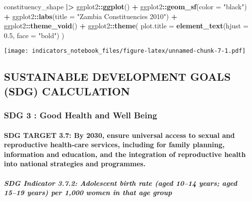 \documentclass[
]{article}
\newenvironment{Shaded}{\begin{snugshade}}{\end{snugshade}}
\newcommand{\AttributeTok}[1]{\textcolor[rgb]{0.13,0.29,0.53}{#1}}
\newcommand{\FloatTok}[1]{\textcolor[rgb]{0.00,0.00,0.81}{#1}}
\newcommand{\FunctionTok}[1]{\textcolor[rgb]{0.13,0.29,0.53}{\textbf{#1}}}
\newcommand{\NormalTok}[1]{#1}
\newcommand{\SpecialCharTok}[1]{\textcolor[rgb]{0.81,0.36,0.00}{\textbf{#1}}}
\newcommand{\StringTok}[1]{\textcolor[rgb]{0.31,0.60,0.02}{#1}}
\begin{document}
\begin{Shaded}
\begin{Highlighting}[]
\NormalTok{constituency\_shape }\SpecialCharTok{|\textgreater{}}
\NormalTok{  ggplot2}\SpecialCharTok{::}\FunctionTok{ggplot}\NormalTok{() }\SpecialCharTok{+}
\NormalTok{  ggplot2}\SpecialCharTok{::}\FunctionTok{geom\_sf}\NormalTok{(}\AttributeTok{color =} \StringTok{"black"}\NormalTok{) }\SpecialCharTok{+}
\NormalTok{  ggplot2}\SpecialCharTok{::}\FunctionTok{labs}\NormalTok{(}\AttributeTok{title =} \StringTok{"Zambia Constituencies 2010"}\NormalTok{) }\SpecialCharTok{+}
\NormalTok{  ggplot2}\SpecialCharTok{::}\FunctionTok{theme\_void}\NormalTok{() }\SpecialCharTok{+}
\NormalTok{  ggplot2}\SpecialCharTok{::}\FunctionTok{theme}\NormalTok{(}
    \AttributeTok{plot.title =} \FunctionTok{element\_text}\NormalTok{(}\AttributeTok{hjust =} \FloatTok{0.5}\NormalTok{, }\AttributeTok{face =} \StringTok{"bold"}\NormalTok{)}
\NormalTok{  )}
\end{Highlighting}
\end{Shaded}

\texttt{[image: indicators\_notebook\_files/figure-latex/unnamed-chunk-7-1.pdf]}

\subsection{SUSTAINABLE DEVELOPMENT GOALS (SDG)
CALCULATION}\label{sustainable-development-goals-sdg-calculation}

\subsubsection{SDG 3 : Good Health and Well
Being}\label{sdg-3-good-health-and-well-being}

\paragraph{SDG TARGET 3.7: By 2030, ensure universal access to sexual
and reproductive health-care services, including for family planning,
information and education, and the integration of reproductive health
into national strategies and
programmes.}\label{sdg-target-3.7-by-2030-ensure-universal-access-to-sexual-and-reproductive-health-care-services-including-for-family-planning-information-and-education-and-the-integration-of-reproductive-health-into-national-strategies-and-programmes.}

\subparagraph{\texorpdfstring{\textbf{SDG Indicator 3.7.2: Adolescent
birth rate (aged 10--14 years; aged 15--19 years) per 1,000 women in
that age
group}}{SDG Indicator 3.7.2: Adolescent birth rate (aged 10--14 years; aged 15--19 years) per 1,000 women in that age group}}\label{sdg-indicator-3.7.2-adolescent-birth-rate-aged-1014-years-aged-1519-years-per-1000-women-in-that-age-group}
\end{document}
